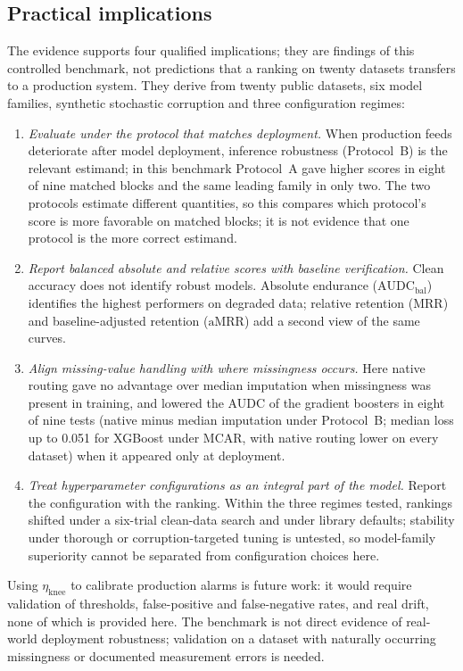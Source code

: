 \documentclass[pdflatex,sn-mathphys]{sn-jnl}
\theoremstyle{thmstyleone}
\theoremstyle{thmstyletwo}
\theoremstyle{thmstylethree}
\newcommand{\AUDC}{\mathrm{AUDC}}
\newcommand{\MRR}{\mathrm{MRR}}
\newcommand{\aMRR}{\mathrm{aMRR}}
\newcommand{\etaknee}{\eta_{\mathrm{knee}}}
\begin{document}
\subsection{Practical implications}\label{sec:disc:practice}

The evidence supports four qualified implications; they are findings of this controlled benchmark, not predictions that a ranking on twenty datasets transfers to a production system. They derive from twenty public datasets, six model families, synthetic stochastic corruption and three configuration regimes:
\begin{enumerate}
\item \emph{Evaluate under the protocol that matches deployment.} When production feeds deteriorate after model deployment, inference robustness (Protocol~B) is the relevant estimand; in this benchmark Protocol~A gave higher scores in eight of nine matched blocks and the same leading family in only two. The two protocols estimate different quantities, so this compares which protocol's score is more favorable on matched blocks; it is not evidence that one protocol is the more correct estimand.
\item \emph{Report balanced absolute and relative scores with baseline verification.} Clean accuracy does not identify robust models. Absolute endurance ($\AUDC_{\mathrm{bal}}$) identifies the highest performers on degraded data; relative retention ($\MRR$) and baseline-adjusted retention ($\aMRR$) add a second view of the same curves.
\item \emph{Align missing-value handling with where missingness occurs.} Here native routing gave no advantage over median imputation when missingness was present in training, and lowered the AUDC of the gradient boosters in eight of nine tests (native minus median imputation under Protocol~B; median loss up to 0.051 for XGBoost under MCAR, with native routing lower on every dataset) when it appeared only at deployment.
\item \emph{Treat hyperparameter configurations as an integral part of the model.} Report the configuration with the ranking. Within the three regimes tested, rankings shifted under a six-trial clean-data search and under library defaults; stability under thorough or corruption-targeted tuning is untested, so model-family superiority cannot be separated from configuration choices here.
\end{enumerate}
Using $\etaknee$ to calibrate production alarms is future work: it would require validation of thresholds, false-positive and false-negative rates, and real drift, none of which is provided here. The benchmark is not direct evidence of real-world deployment robustness; validation on a dataset with naturally occurring missingness or documented measurement errors is needed.
\end{document}
